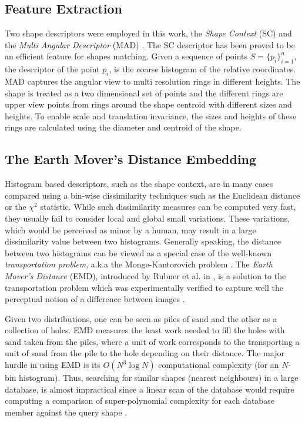 \documentclass[10pt, conference, compsocconf]{IEEEtran}
\begin{document}
\subsection{Feature Extraction}
Two shape descriptors were employed in this work, the \emph{Shape Context} (SC) \cite{belongie2002shape} and the \emph{Multi Angular Descriptor} (MAD) \cite{saabni2013multi}.
The SC descriptor has been proved to be an efficient feature for shapes matching.
Given a sequence of points $S=\{p_i\}_{i=1}^n$, the descriptor of the point ${p_i}$, is the coarse histogram of the relative coordinates.
MAD captures the angular view to multi resolution rings in different heights. 
The shape is treated as a two dimensional set of points and the different rings are upper view points from rings around the shape centroid with different sizes and heights. 
To enable scale and translation invariance, the sizes and heights of these rings are calculated using the diameter and centroid of the shape.

\subsection{The Earth Mover's Distance Embedding}
Histogram based descriptors, such as the shape context, are in many cases compared using a bin-wise dissimilarity techniques such as the Euclidean distance or the $\chi^2$ statistic.
While such dissimilarity measures can be computed very fast, they usually fail to consider local and global small variations. 
These variations, which would be perceived as minor by a human, may result in a large dissimilarity value between two histograms. 
Generally speaking, the distance between two histograms can be viewed as a special case of the well-known \emph{transportation problem}, a.k.a the Monge-Kantorovich problem \cite{rachev1985monge}.
The \emph{Earth Mover's Distance} (EMD), introduced by Rubner et al. in \cite{rubner2000earth}, is a solution to the transportation problem which was experimentally verified to capture well the perceptual notion of a difference between images \cite{grauman2004fast}.

Given two distributions, one can be seen as piles of sand and the other as a collection of holes. 
EMD measures the least work needed to fill the holes with sand taken from the piles, where a unit of work corresponds to the transporting a unit of sand from the pile to the hole depending on their distance.
The major hurdle in using EMD is its $O\left( {{N^3}\log N} \right)$ computational complexity (for an $N$-bin histogram). 
Thus, searching for similar shapes (nearest neighbours) in a large database, is almost impractical since a linear scan of the database would require computing a comparison of super-polynomial complexity for each database member against the query shape \cite{saabni2013efficient}. 
\end{document}
